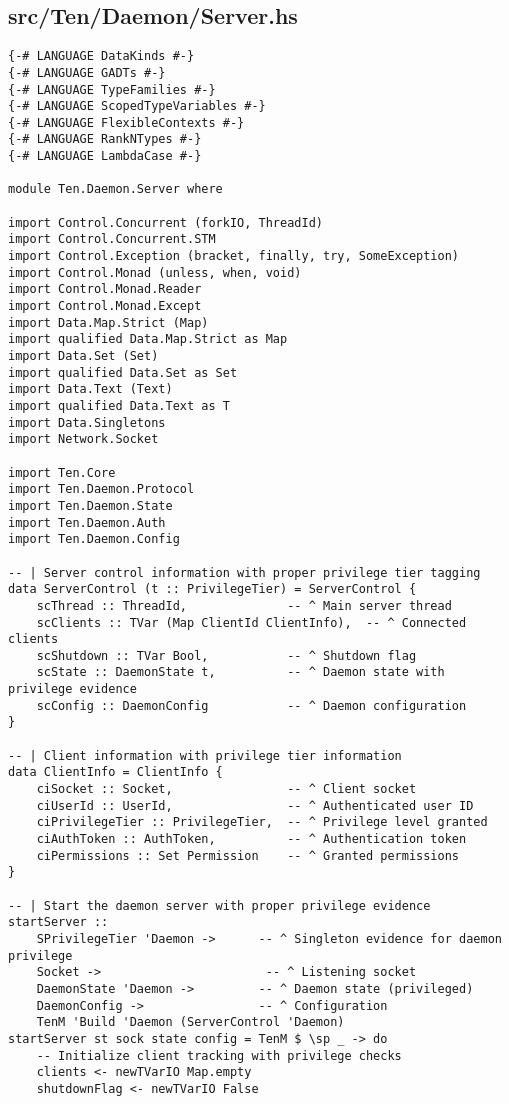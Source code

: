\documentclass{article}
\begin{document}
\subsection{src/Ten/Daemon/Server.hs}

\begin{tcolorbox}[title=Ten/Daemon/Server.hs Changes]
\begin{verbatim}
{-# LANGUAGE DataKinds #-}
{-# LANGUAGE GADTs #-}
{-# LANGUAGE TypeFamilies #-}
{-# LANGUAGE ScopedTypeVariables #-}
{-# LANGUAGE FlexibleContexts #-}
{-# LANGUAGE RankNTypes #-}
{-# LANGUAGE LambdaCase #-}

module Ten.Daemon.Server where

import Control.Concurrent (forkIO, ThreadId)
import Control.Concurrent.STM
import Control.Exception (bracket, finally, try, SomeException)
import Control.Monad (unless, when, void)
import Control.Monad.Reader
import Control.Monad.Except
import Data.Map.Strict (Map)
import qualified Data.Map.Strict as Map
import Data.Set (Set)
import qualified Data.Set as Set
import Data.Text (Text)
import qualified Data.Text as T
import Data.Singletons
import Network.Socket

import Ten.Core
import Ten.Daemon.Protocol
import Ten.Daemon.State
import Ten.Daemon.Auth
import Ten.Daemon.Config

-- | Server control information with proper privilege tier tagging
data ServerControl (t :: PrivilegeTier) = ServerControl {
    scThread :: ThreadId,              -- ^ Main server thread
    scClients :: TVar (Map ClientId ClientInfo),  -- ^ Connected clients
    scShutdown :: TVar Bool,           -- ^ Shutdown flag
    scState :: DaemonState t,          -- ^ Daemon state with privilege evidence
    scConfig :: DaemonConfig           -- ^ Daemon configuration
}

-- | Client information with privilege tier information
data ClientInfo = ClientInfo {
    ciSocket :: Socket,                -- ^ Client socket
    ciUserId :: UserId,                -- ^ Authenticated user ID
    ciPrivilegeTier :: PrivilegeTier,  -- ^ Privilege level granted
    ciAuthToken :: AuthToken,          -- ^ Authentication token
    ciPermissions :: Set Permission    -- ^ Granted permissions
}

-- | Start the daemon server with proper privilege evidence
startServer ::
    SPrivilegeTier 'Daemon ->      -- ^ Singleton evidence for daemon privilege
    Socket ->                       -- ^ Listening socket
    DaemonState 'Daemon ->         -- ^ Daemon state (privileged)
    DaemonConfig ->                -- ^ Configuration
    TenM 'Build 'Daemon (ServerControl 'Daemon)
startServer st sock state config = TenM $ \sp _ -> do
    -- Initialize client tracking with privilege checks
    clients <- newTVarIO Map.empty
    shutdownFlag <- newTVarIO False


\end{verbatim}
\end{tcolorbox}
\end{document}
